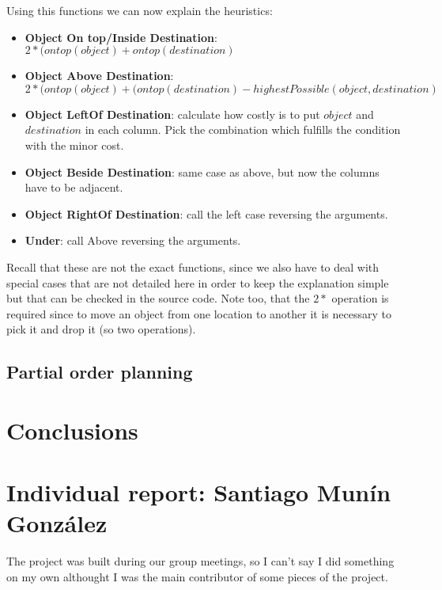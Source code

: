 \documentclass[11pt]{article}
\begin{document}
         Using this functions we can now explain the heuristics:

        \begin{itemize}
          \item {\bf Object On top/Inside Destination}: 
            $2 * (ontop(object) + ontop(destination)$
          \item {\bf Object Above Destination}:
            $2 * (ontop(object) + (ontop(destination) - highestPossible(object, destination)$
          \item {\bf Object LeftOf Destination}: calculate how costly is to put $object$ 
          and $destination$ in each column. Pick the combination which fulfills the 
          condition with the minor cost.
          \item {\bf Object Beside Destination}: same case as above, but now the columns 
          have to be adjacent.
          \item {\bf Object RightOf Destination}: call the left case reversing the 
          arguments.
          \item {\bf Under}: call Above reversing the arguments.
        \end{itemize}

        Recall that these are not the exact functions, since we also have to deal with 
        special cases that are not detailed here in order to keep the explanation simple 
        but that can be checked in the source code. Note too, that the $2 *$ operation is
        required since to move an object from one location to another it is necessary to 
        pick it and drop it (so two operations).

	\subsection{Partial order planning}

	\section{Conclusions}
\newpage
\appendix
\section{Individual report: Santiago Munín González}
The project was built during our group meetings, so I can't say I did something on my own althought I 
was the main contributor of some pieces of the project.
\end{document}

